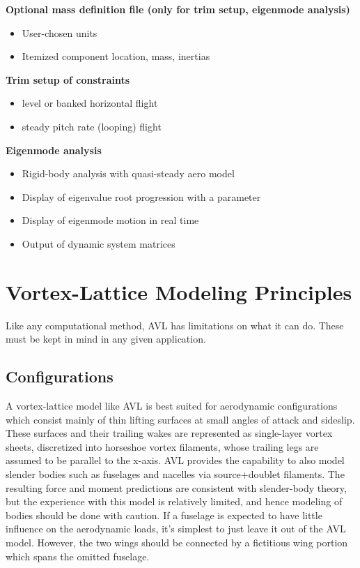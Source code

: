 %
\textbf{Optional mass definition file (only for trim setup, eigenmode analysis)} 
\begin{itemize}	
	\item User-chosen units
	\item Itemized component location, mass, inertias
\end{itemize}
%
\textbf{Trim setup of constraints} 
\begin{itemize}	
	\item level or banked  horizontal flight
	\item steady pitch rate (looping) flight
\end{itemize}
%
\textbf{Eigenmode analysis}
\begin{itemize}
	\item Rigid-body analysis with quasi-steady aero model
	\item Display of eigenvalue root progression with a parameter
	\item Display of eigenmode motion in real time
	\item Output of dynamic system matrices
\end{itemize}


\chapter{Vortex-Lattice Modeling Principles}
Like any computational method, AVL has limitations on what it can do.
These must be kept in mind in any given application.

\section{Configurations}
A vortex-lattice model like AVL is best suited for aerodynamic configurations
which consist mainly of thin lifting surfaces at small angles of attack
and sideslip.  These surfaces and their trailing wakes are represented 
as single-layer vortex sheets, discretized into horseshoe vortex filaments, 
whose trailing legs are assumed to be parallel to the x-axis.  AVL provides 
the capability to also model slender bodies such as fuselages and nacelles 
via source+doublet filaments.  The resulting force and moment predictions 
are consistent with slender-body theory, but the experience with this model 
is relatively limited, and hence modeling of bodies should be done with 
caution.  If a fuselage is expected to have little influence on the 
aerodynamic loads, it's simplest to just leave it out of the AVL model.
However, the two wings should be connected by a fictitious wing portion
which spans the omitted fuselage.

